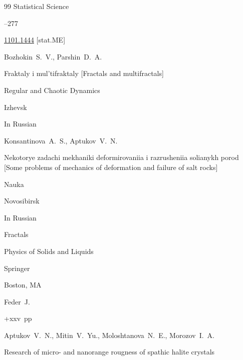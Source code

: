 \begin{thebibliography}{99}
\jour Statistical Science




--277


\arxiv \href{https://arxiv.org/abs/1101.1444}{1101.1444} [stat.ME]






\by Bozhokin~S.~V., Parshin~D.~A.

\book Fraktaly i mul'tifraktaly \rm [Fractals and multifractals]


\publ Regular and Chaotic Dynamics

\publaddr Izhevsk


\lang In Russian




\by Konsantinova~A.~S., Aptukov~V.~N.

\paper Nekotorye zadachi mekhaniki deformirovaniia i razrusheniia solianykh porod \rm[Some problems of mechanics of deformation and failure of salt rocks]


\publ  Nauka

\publaddr Novosibirsk


\lang In Russian

	


\book  Fractals


\serial Physics of Solids and Liquids

\publ Springer

\publaddr Boston, MA

\by Feder~J.

+xxv~pp \nofrills







\by Aptukov~V.~N., Mitin~V.~Yu., Moloshtanova~N.~E., Morozov~I.~A.

\paper Research of micro- and nanorange rougness of spathic halite crystals


\end{thebibliography}
